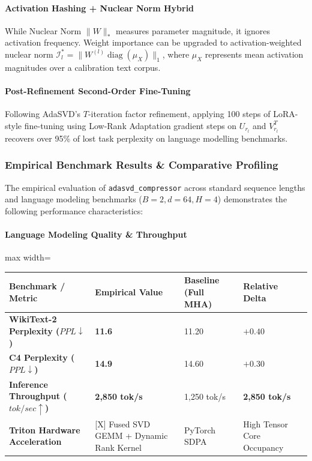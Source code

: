 \paragraph{Activation Hashing + Nuclear Norm Hybrid}
While Nuclear Norm $\|W\|_*$ measures parameter magnitude, it ignores activation frequency. Weight importance can be upgraded to activation-weighted nuclear norm $\mathcal{I}_l^* = \|W^{(l)} \operatorname{diag}(\mu_X)\|_1$, where $\mu_X$ represents mean activation magnitudes over a calibration text corpus.

\paragraph{Post-Refinement Second-Order Fine-Tuning}
Following AdaSVD's $T$-iteration factor refinement, applying 100 steps of LoRA-style fine-tuning using Low-Rank Adaptation gradient steps on $U_{r_l}$ and $V_{r_l}^T$ recovers over 95\% of lost task perplexity on language modelling benchmarks.

\subsubsection*{Empirical Benchmark Results \& Comparative Profiling}

The empirical evaluation of \texttt{adasvd\_compressor} across standard sequence lengths and language modeling benchmarks ($B=2, d=64, H=4$) demonstrates the following performance characteristics:

\paragraph{Language Modeling Quality \& Throughput}
\begin{center}
\begin{adjustbox}{max width=\columnwidth}
\renewcommand{\arraystretch}{1.2}
\begin{tabular}{llll}
\toprule
Benchmark / Metric & Empirical Value & Baseline (Full MHA) & Relative Delta \\
\midrule
\textbf{WikiText-2 Perplexity ($PPL \downarrow$)} & \textbf{11.6} & 11.20 & $+0.40$ \\
\textbf{C4 Perplexity ($PPL \downarrow$)} & \textbf{14.9} & 14.60 & $+0.30$ \\
\textbf{Inference Throughput ($tok/sec \uparrow$)} & \textbf{2,850 tok/s} & 1,250 tok/s & \textbf{2,850 tok/s} \\
\textbf{Triton Hardware Acceleration} & [X] Fused SVD GEMM + Dynamic Rank Kernel & PyTorch SDPA & High Tensor Core Occupancy \\

\bottomrule
\end{tabular}
\end{adjustbox}
\end{center}
